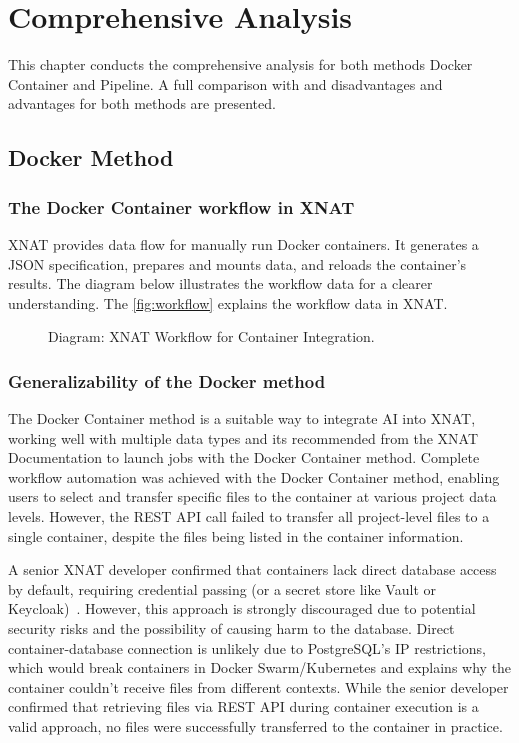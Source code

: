 \chapter{Comprehensive Analysis}
This chapter conducts the comprehensive analysis for both methods Docker Container and Pipeline. 
A full comparison with and disadvantages and advantages for both methods are presented.
\section{Docker Method}
\subsection{The Docker Container workflow in XNAT}

XNAT provides data flow for manually run Docker containers. It generates a JSON specification, prepares and mounts data, and reloads the container's results.
The diagram below illustrates the workflow data for a clearer understanding.  
The \autoref{fig:workflow} explains the workflow data in XNAT.

\begin{figure}[H]
    \centering
    \def\svgwidth{\linewidth} 
    
    \caption{Diagram: XNAT Workflow for Container Integration.}
    \label{fig:workflow}
\end{figure}

\subsection{Generalizability of the Docker method}
The Docker Container method is a suitable way to integrate AI into XNAT, working well with multiple data types and its recommended from the XNAT Documentation to launch jobs with the Docker Container method. Complete workflow automation was achieved with the Docker Container method, enabling users to select and transfer specific files to the container at various project data levels. However, the REST API call failed to transfer all project-level files to a single container, despite the files being listed in the container information.  

A senior XNAT developer confirmed that containers lack direct database access by default, requiring credential passing (or a secret store like Vault or Keycloak)~\cite{database}. However, this approach is strongly discouraged due to potential security risks and the possibility of causing harm to the database. Direct container-database connection is unlikely due to PostgreSQL's IP restrictions, which would break containers in Docker Swarm/Kubernetes and explains why the container couldn't receive files from different contexts.
While the senior developer confirmed that retrieving files via REST API during container execution is a valid approach, no files were successfully transferred to the container in practice.

